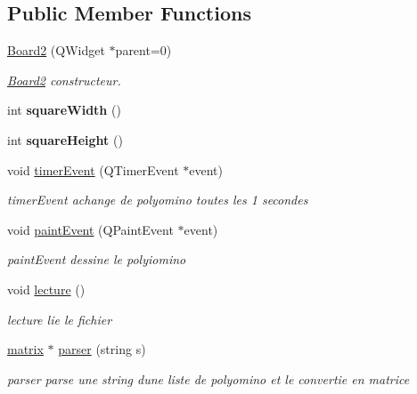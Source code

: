 \subsection*{Public Member Functions}
\begin{DoxyCompactItemize}
\item 
\hyperlink{class_board2_aae64d4a675128c16c00d07149c1a4ee3}{Board2} (Q\+Widget $\ast$parent=0)
\begin{DoxyCompactList}\small\item\em \hyperlink{class_board2}{Board2} constructeur. \end{DoxyCompactList}\item 
int {\bfseries square\+Width} ()\hypertarget{class_board2_a427244655bbee1815563d39858dc0fa3}{}\label{class_board2_a427244655bbee1815563d39858dc0fa3}

\item 
int {\bfseries square\+Height} ()\hypertarget{class_board2_a7c2b21739e7afcd6442b1d9e4c822ad5}{}\label{class_board2_a7c2b21739e7afcd6442b1d9e4c822ad5}

\item 
void \hyperlink{class_board2_af4b54598413c7146ae1281ffb0da1002}{timer\+Event} (Q\+Timer\+Event $\ast$event)
\begin{DoxyCompactList}\small\item\em timer\+Event achange de polyomino toutes les 1 secondes \end{DoxyCompactList}\item 
void \hyperlink{class_board2_a5457e120d690a6706c1e9f2949777721}{paint\+Event} (Q\+Paint\+Event $\ast$event)
\begin{DoxyCompactList}\small\item\em paint\+Event dessine le polyiomino \end{DoxyCompactList}\item 
void \hyperlink{class_board2_ab02675377010f5f137a5d34f013ffc42}{lecture} ()\hypertarget{class_board2_ab02675377010f5f137a5d34f013ffc42}{}\label{class_board2_ab02675377010f5f137a5d34f013ffc42}

\begin{DoxyCompactList}\small\item\em lecture lie le fichier \end{DoxyCompactList}\item 
\hyperlink{classmatrix}{matrix} $\ast$ \hyperlink{class_board2_ac7a6316973f7f62ed5ccdbff96d08fcc}{parser} (string s)
\begin{DoxyCompactList}\small\item\em parser parse une string d\textquotesingle{}une liste de polyomino et le convertie en matrice \end{DoxyCompactList}\end{DoxyCompactItemize}
